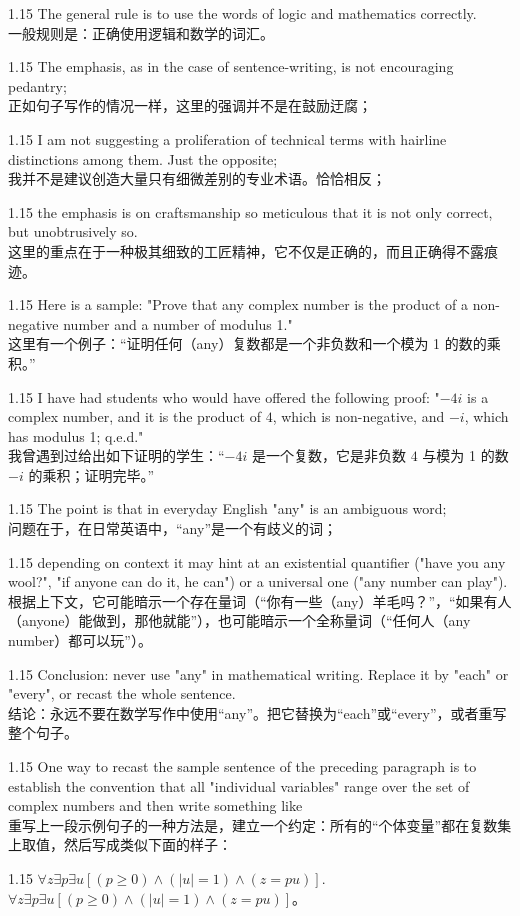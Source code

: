 \documentclass[12pt,a4paper]{article}
\newcommand{\bilingual}[2]{
    \begin{spacing}{1.15} %
        \noindent \normalsize #1 \\[-0.5ex] %
        \small \textcolor{blue!70!black}{#2} %
    \end{spacing}
    \vspace{0.8em} %
}
\begin{document}
\bilingual{The general rule is to use the words of logic and mathematics correctly.}
{一般规则是：正确使用逻辑和数学的词汇。} %

\bilingual{The emphasis, as in the case of sentence-writing, is not encouraging pedantry;}
{正如句子写作的情况一样，这里的强调并不是在鼓励迂腐；} %

\bilingual{I am not suggesting a proliferation of technical terms with hairline distinctions among them. Just the opposite;}
{我并不是建议创造大量只有细微差别的专业术语。恰恰相反；} %

\bilingual{the emphasis is on craftsmanship so meticulous that it is not only correct, but unobtrusively so.}
{这里的重点在于一种极其细致的工匠精神，它不仅是正确的，而且正确得不露痕迹。} %

\bilingual{Here is a sample: "Prove that any complex number is the product of a non-negative number and a number of modulus 1."}
{这里有一个例子：“证明任何（any）复数都是一个非负数和一个模为 1 的数的乘积。”} %

\bilingual{I have had students who would have offered the following proof: "$-4i$ is a complex number, and it is the product of $4$, which is non-negative, and $-i$, which has modulus 1; q.e.d."}
{我曾遇到过给出如下证明的学生：“$-4i$ 是一个复数，它是非负数 $4$ 与模为 1 的数 $-i$ 的乘积；证明完毕。”} %

\bilingual{The point is that in everyday English "any" is an ambiguous word;}
{问题在于，在日常英语中，“any”是一个有歧义的词；} %

\bilingual{depending on context it may hint at an existential quantifier ("have you any wool?", "if anyone can do it, he can") or a universal one ("any number can play").}
{根据上下文，它可能暗示一个存在量词（“你有一些（any）羊毛吗？”，“如果有人（anyone）能做到，那他就能”），也可能暗示一个全称量词（“任何人（any number）都可以玩”）。} %

\bilingual{Conclusion: never use "any" in mathematical writing. Replace it by "each" or "every", or recast the whole sentence.}
{结论：永远不要在数学写作中使用“any”。把它替换为“each”或“every”，或者重写整个句子。} %

\bilingual{One way to recast the sample sentence of the preceding paragraph is to establish the convention that all "individual variables" range over the set of complex numbers and then write something like}
{重写上一段示例句子的一种方法是，建立一个约定：所有的“个体变量”都在复数集上取值，然后写成类似下面的样子：} %

\bilingual{$\forall z \exists p \exists u [(p \ge 0) \land (|u|=1) \land (z=pu)]$.}
{$\forall z \exists p \exists u [(p \ge 0) \land (|u|=1) \land (z=pu)]。$} %
\end{document}
